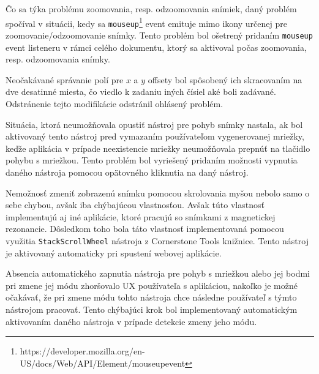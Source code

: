 Čo sa týka problému zoomovania, resp. odzoomovania snímiek, daný problém spočíval v situácii, kedy sa \texttt{mouseup}\footnote{https://developer.mozilla.org/en-US/docs/Web/API/Element/mouseup\textunderscore event} event emituje mimo ikony určenej pre zoomovanie/odzoomovanie snímky. Tento problém bol ošetrený pridaním \texttt{mouseup} event listeneru v rámci celého dokumentu, ktorý sa aktivoval počas zoomovania, resp. odzoomovania snímky.

Neočakávané správanie polí pre $x$ a $y$ offsety bol spôsobený ich skracovaním na dve desatinné miesta, čo viedlo k zadaniu iných čísiel aké boli zadávané. Odstránenie tejto modifikácie odstránil ohlásený problém.

Situácia, ktorá neumožňovala opustiť nástroj pre pohyb snímky nastala, ak bol aktivovaný tento nástroj pred vymazaním používateľom vygenerovanej mriežky, keďže aplikácia v prípade neexistencie mriežky neumožňovala prepnúť na tlačidlo pohybu s mriežkou. Tento problém bol vyriešený pridaním možnosti vypnutia daného nástroja pomocou opätovného kliknutia na daný nástroj.

Nemožnosť zmeniť zobrazenú snímku pomocou skrolovania myšou nebolo samo o sebe chybou, avšak iba chýbajúcou vlastnosťou. Avšak túto vlastnosť implementujú aj iné aplikácie, ktoré pracujú so snímkami z magnetickej rezonancie. Dôsledkom toho bola táto vlastnosť implementovaná pomocou využitia \texttt{StackScrollWheel} nástroja z Cornerstone Tools knižnice. Tento nástroj je aktivovaný automaticky pri spustení webovej aplikácie.

\clearpage

Absencia automatického zapnutia nástroja pre pohyb s mriežkou alebo jej bodmi pri zmene jej módu zhoršovalo UX používateľa s aplikáciou, nakoľko je možné očakávať, že pri zmene módu tohto nástroja chce následne používateľ s týmto nástrojom pracovať. Tento chýbajúci krok bol implementovaný automatickým aktivovaním daného nástroja v prípade detekcie zmeny jeho módu.